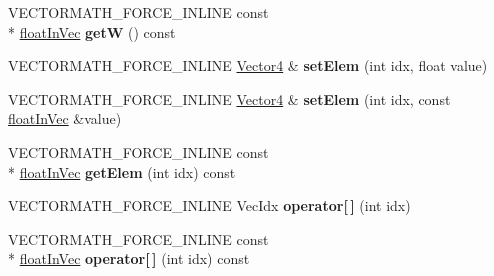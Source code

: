 \begin{DoxyCompactItemize}
\item 
\hypertarget{class_vectormath_1_1_aos_1_1_vector4_a59f1a667c2299b3e7fffc36c1b84c604}{V\+E\+C\+T\+O\+R\+M\+A\+T\+H\+\_\+\+F\+O\+R\+C\+E\+\_\+\+I\+N\+L\+I\+N\+E const \\*
\hyperlink{class_vectormath_1_1float_in_vec}{float\+In\+Vec} {\bfseries get\+W} () const }\label{class_vectormath_1_1_aos_1_1_vector4_a59f1a667c2299b3e7fffc36c1b84c604}

\item 
\hypertarget{class_vectormath_1_1_aos_1_1_vector4_adb13ca4795d04c6badc13e625265ca1b}{V\+E\+C\+T\+O\+R\+M\+A\+T\+H\+\_\+\+F\+O\+R\+C\+E\+\_\+\+I\+N\+L\+I\+N\+E \hyperlink{class_vectormath_1_1_aos_1_1_vector4}{Vector4} \& {\bfseries set\+Elem} (int idx, float value)}\label{class_vectormath_1_1_aos_1_1_vector4_adb13ca4795d04c6badc13e625265ca1b}

\item 
\hypertarget{class_vectormath_1_1_aos_1_1_vector4_a21282ca6c2aa5889f41df1f9c83f6dc8}{V\+E\+C\+T\+O\+R\+M\+A\+T\+H\+\_\+\+F\+O\+R\+C\+E\+\_\+\+I\+N\+L\+I\+N\+E \hyperlink{class_vectormath_1_1_aos_1_1_vector4}{Vector4} \& {\bfseries set\+Elem} (int idx, const \hyperlink{class_vectormath_1_1float_in_vec}{float\+In\+Vec} \&value)}\label{class_vectormath_1_1_aos_1_1_vector4_a21282ca6c2aa5889f41df1f9c83f6dc8}

\item 
\hypertarget{class_vectormath_1_1_aos_1_1_vector4_a5ed10c85848003bbaa7dfdb9046aee17}{V\+E\+C\+T\+O\+R\+M\+A\+T\+H\+\_\+\+F\+O\+R\+C\+E\+\_\+\+I\+N\+L\+I\+N\+E const \\*
\hyperlink{class_vectormath_1_1float_in_vec}{float\+In\+Vec} {\bfseries get\+Elem} (int idx) const }\label{class_vectormath_1_1_aos_1_1_vector4_a5ed10c85848003bbaa7dfdb9046aee17}

\item 
\hypertarget{class_vectormath_1_1_aos_1_1_vector4_af17b2f536750a2cbbef96c855ef43eda}{V\+E\+C\+T\+O\+R\+M\+A\+T\+H\+\_\+\+F\+O\+R\+C\+E\+\_\+\+I\+N\+L\+I\+N\+E Vec\+Idx {\bfseries operator\mbox{[}$\,$\mbox{]}} (int idx)}\label{class_vectormath_1_1_aos_1_1_vector4_af17b2f536750a2cbbef96c855ef43eda}

\item 
\hypertarget{class_vectormath_1_1_aos_1_1_vector4_a54e18cdf3dc7b9669515bb50e79ef64e}{V\+E\+C\+T\+O\+R\+M\+A\+T\+H\+\_\+\+F\+O\+R\+C\+E\+\_\+\+I\+N\+L\+I\+N\+E const \\*
\hyperlink{class_vectormath_1_1float_in_vec}{float\+In\+Vec} {\bfseries operator\mbox{[}$\,$\mbox{]}} (int idx) const }\label{class_vectormath_1_1_aos_1_1_vector4_a54e18cdf3dc7b9669515bb50e79ef64e}


\end{DoxyCompactItemize}
